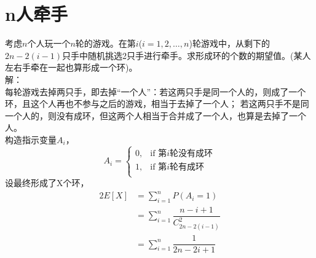 \documentclass[a4papers]{ctexart}
\begin{document}
\section{n人牵手}
考虑$n$个人玩一个$n$轮的游戏。在第$i$($i=1,2,…,n$)轮游戏中，从剩下的
$2n-2(i-1)$只手中随机挑选2只手进行牵手。求形成环的个数的期望值。(某人左右手牵在一起也算形成一个环)。\\
\noindent 解：\\
\indent 每轮游戏去掉两只手，即去掉“一个人”：若这两只手是同一个人的，则成了一个环，且这个人再也不参与之后的游戏，相当于去掉了一个人；
若这两只手不是同一个人的，则没有成环，但这两个人相当于合并成了一个人，也算是去掉了一个人。\\
\indent 构造指示变量$A_i$，
\[ A_i = \begin{cases}
    0, & \mbox{if 第}i\mbox{轮没有成环}\\
    1, & \mbox{if 第}i\mbox{轮有成环}\\
\end{cases} \]
\indent 设最终形成了X个环，
\begin{alignat*}{2}
     E[X] &= \sum_{i=1}^n P(A_i=1)\\
     &= \sum_{i=1}^n \dfrac{n-i+1}{C_{2n-2(i-1)}^2}\\
     &= \sum_{i=1}^n \dfrac{1}{2n-2i+1}
\end{alignat*}
\end{document}
